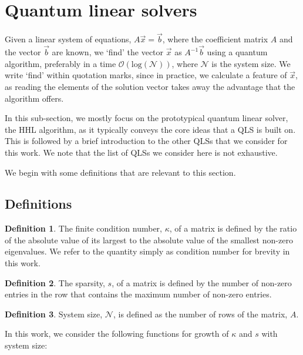 \documentclass[%
 reprint,
 superscriptaddress,
 amsmath,amssymb,
 aps,
 pra,
floatfix,
nofootinbib,
]{revtex4-2}
\theoremstyle{definition}
\newtheorem{definition}{Definition}[section]
\theoremstyle{remark}
\begin{document}
\section{Quantum linear solvers} \label{sec:qls} 

Given a linear system of equations, $A \vec{x}=\vec{b}$, where the coefficient matrix $A$ and the vector $\vec{b}$ are known, we `find' the vector $\vec{x}$ as $A^{-1} \vec{b}$ using a quantum algorithm, preferably in a time $\mathcal{O}(\mathrm{log}(\mathcal{N}))$, where $\mathcal{N}$ is the system size. We write `find' within quotation marks, since in practice, we calculate a feature of $\vec{x}$, as reading the elements of the solution vector takes away the advantage that the algorithm offers. 

In this sub-section, we mostly focus on the prototypical quantum linear solver, the HHL algorithm, as it typically conveys the core ideas that a QLS is built on. This is followed by a brief introduction to the other QLSs that we consider for this work. We note that the list of QLSs we consider here is not exhaustive. 

We begin with some definitions that are relevant to this section. 

\subsection{Definitions} 

\begin{definition} \label{def:kappa}
The finite condition number, $\kappa$, of a matrix is defined by the ratio of the absolute value of its largest to the absolute value of the smallest non-zero eigenvalues. We refer to the quantity simply as condition number for brevity in this work. 
\end{definition} 

\begin{definition} \label{def:sparsity}
The sparsity, $s$, of a matrix is defined by the number of non-zero entries in the row that contains the maximum number of non-zero entries. 
\end{definition} 

\begin{definition} \label{def:syssize} 
System size, $\mathcal{N}$, is defined as the number of rows of the matrix, $A$. 
\end{definition} 

In this work, we consider the following functions for growth of $\kappa$ and $s$ with system size: 
\end{document}
